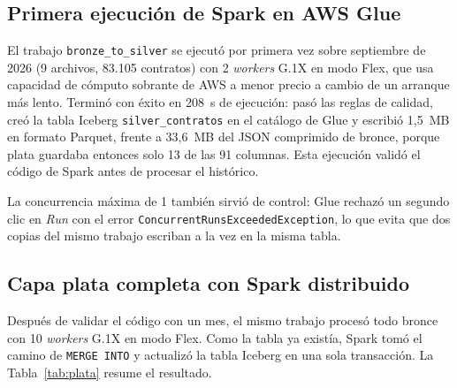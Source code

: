\documentclass[conference]{IEEEtran}
\begin{document}
\subsection{Primera ejecución de Spark en AWS Glue}
El trabajo \texttt{bronze\_to\_silver} se ejecutó por primera vez sobre septiembre de 2026 (9 archivos, 83.105 contratos) con 2 \textit{workers} G.1X en modo Flex, que usa capacidad de cómputo sobrante de AWS a menor precio a cambio de un arranque más lento. Terminó con éxito en 208~s de ejecución: pasó las reglas de calidad, creó la tabla Iceberg \texttt{silver\_contratos} en el catálogo de Glue y escribió 1,5~MB en formato Parquet, frente a 33,6~MB del JSON comprimido de bronce, porque plata guardaba entonces solo 13 de las 91 columnas. Esta ejecución validó el código de Spark antes de procesar el histórico.

La concurrencia máxima de 1 también sirvió de control: Glue rechazó un segundo clic en \emph{Run} con el error \texttt{Concurrent\-Runs\-Exceeded\-Exception}, lo que evita que dos copias del mismo trabajo escriban a la vez en la misma tabla.

\subsection{Capa plata completa con Spark distribuido}
Después de validar el código con un mes, el mismo trabajo procesó todo bronce con 10 \textit{workers} G.1X en modo Flex. Como la tabla ya existía, Spark tomó el camino de \texttt{MERGE INTO} y actualizó la tabla Iceberg en una sola transacción. La Tabla~\ref{tab:plata} resume el resultado.
\end{document}
